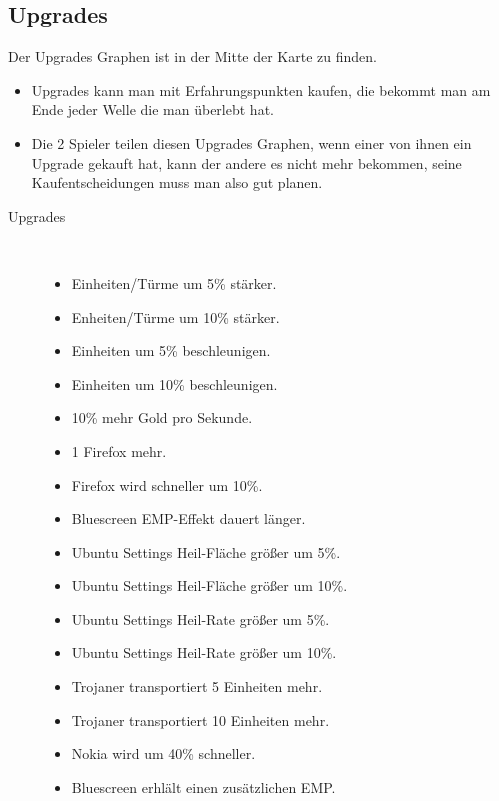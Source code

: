 \subsection{Upgrades}
Der Upgrades Graphen ist in der Mitte der Karte zu finden. 
\begin{itemize}
\item Upgrades kann man mit Erfahrungspunkten kaufen, die bekommt man am Ende jeder Welle die man überlebt hat.
\item Die 2 Spieler teilen diesen Upgrades Graphen, wenn einer von ihnen ein Upgrade gekauft hat, kann der
andere es nicht mehr bekommen, seine Kaufentscheidungen muss man also gut planen.
\end{itemize}

\begin{description}
\item[Upgrades]~\\
\begin{itemize}
	\item Einheiten/Türme um 5\% stärker.
	\item Enheiten/Türme um 10\% stärker.
	\item Einheiten um 5\% beschleunigen.
	\item Einheiten um 10\% beschleunigen.
	\item 10\% mehr Gold pro Sekunde.
	\item 1 Firefox mehr.
	\item Firefox wird schneller um 10\%.
	\item Bluescreen EMP-Effekt dauert länger.
	\item Ubuntu Settings Heil-Fläche größer um 5\%.
	\item Ubuntu Settings Heil-Fläche größer um 10\%.
	\item Ubuntu Settings Heil-Rate größer um 5\%.
	\item Ubuntu Settings Heil-Rate größer um 10\%.
	\item Trojaner transportiert 5 Einheiten mehr.
	\item Trojaner transportiert 10 Einheiten mehr.
	\item Nokia wird um 40\% schneller.
	\item Bluescreen erhlält einen zusätzlichen EMP.
\end{itemize}
\end{description}